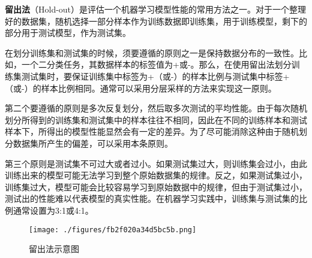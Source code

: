 

\textbf{留出法}（Hold-out）是评估一个机器学习模型性能的常用方法之一。对于一个整理好的数据集，随机选择一部分样本作为训练数据即训练集，用于训练模型，剩下的部分用于测试模型，作为测试集。

在划分训练集和测试集的时候，须要遵循的原则之一是保持数据分布的一致性。比如，一个二分类任务，其数据样本的标签值为+或-。那么，在使用留出法划分训练集测试集时，要保证训练集中标签为+（或-）的样本比例与测试集中标签+（或-）的样本比例相同。通常可以采用分层采样的方法来实现这一原则。

第二个要遵循的原则是多次反复划分，然后取多次测试的平均性能。由于每次随机划分所得到的训练集和测试集中的样本往往不相同，因此在不同的训练样本和测试样本下，所得出的模型性能显然会有一定的差异。为了尽可能消除这种由于随机划分数据集所产生的偏差，可以采用本条原则。

第三个原则是测试集不可过大或者过小。如果测试集过大，则训练集会过小，由此训练出来的模型可能无法学习到整个原始数据集的规律。反之，如果测试集过小，训练集过大，模型可能会比较容易学习到原始数据中的规律，但由于测试集过小，测试出的性能难以代表模型的真实性能。在机器学习实践中，训练集与测试集的比例通常设置为3:1或4:1。


\begin{figure}[ht]
\centering
\texttt{[image: ./figures/fb2f020a34d5bc5b.png]}
\caption{留出法示意图} \label{fig_holdou_1}
\end{figure}
